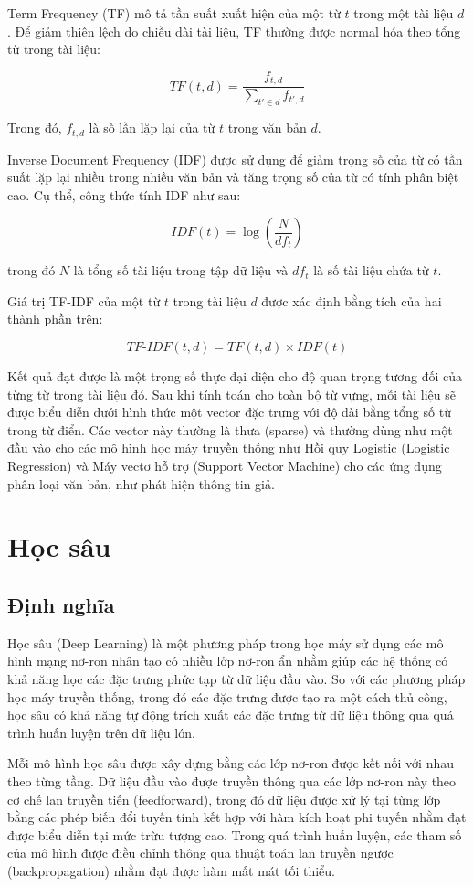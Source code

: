 \documentclass[12pt, a4paper]{report}
\begin{document}
Term Frequency (TF) mô tả tần suất xuất hiện của một từ $t$ trong một tài liệu $d$. Để giảm thiên lệch do chiều dài tài liệu, TF thường được normal hóa theo tổng từ trong tài liệu:

\[
TF(t, d) = \frac{f_{t,d}}{\sum_{t' \in d} f_{t',d}}
\]

Trong đó, $f_{t,d}$ là số lần lặp lại của từ $t$ trong văn bản $d$.

Inverse Document Frequency (IDF) được sử dụng để giảm trọng số của từ có tần suất lặp lại nhiều trong nhiều văn bản và tăng trọng số của từ có tính phân biệt cao. Cụ thể, công thức tính IDF như sau:

\[
IDF(t) = \log \left( \frac{N}{df_t} \right)
\]

trong đó $N$ là tổng số tài liệu trong tập dữ liệu và $df_t$ là số tài liệu chứa từ $t$.

Giá trị TF-IDF của một từ $t$ trong tài liệu $d$ được xác định bằng tích của hai thành phần trên:

\[
TF\text{-}IDF(t, d) = TF(t, d) \times IDF(t)
\]

Kết quả đạt được là một trọng số thực đại diện cho độ quan trọng tương đối của từng từ trong tài liệu đó. Sau khi tính toán cho toàn bộ từ vựng, mỗi tài liệu sẽ được biểu diễn dưới hình thức một vector đặc trưng với độ dài bằng tổng số từ trong từ điển. Các vector này thường là thưa (sparse) và thường dùng như một đầu vào cho các mô hình học máy truyền thống như Hồi quy Logistic (Logistic Regression) và Máy vectơ hỗ trợ (Support Vector Machine) cho các ứng dụng phân loại văn bản, như phát hiện thông tin giả.

\section{Học sâu}

\subsection{Định nghĩa}
Học sâu (Deep Learning) là một phương pháp trong học máy sử dụng các mô hình mạng nơ-ron nhân tạo có nhiều lớp nơ-ron ẩn nhằm giúp các hệ thống có khả năng học các đặc trưng phức tạp từ dữ liệu đầu vào. So với các phương pháp học máy truyền thống, trong đó các đặc trưng được tạo ra một cách thủ công, học sâu có khả năng tự động trích xuất các đặc trưng từ dữ liệu thông qua quá trình huấn luyện trên dữ liệu lớn.

Mỗi mô hình học sâu được xây dựng bằng các lớp nơ-ron được kết nối với nhau theo từng tầng. Dữ liệu đầu vào được truyền thông qua các lớp nơ-ron này theo cơ chế lan truyền tiến (feedforward), trong đó dữ liệu được xử lý tại từng lớp bằng các phép biến đổi tuyến tính kết hợp với hàm kích hoạt phi tuyến nhằm đạt được biểu diễn tại mức trừu tượng cao. Trong quá trình huấn luyện, các tham số của mô hình được điều chỉnh thông qua thuật toán lan truyền ngược (backpropagation) nhằm đạt được hàm mất mát tối thiểu.
\end{document}
